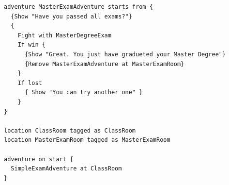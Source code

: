 \documentclass	{xmgr}
\begin{document}
\begin{lstlisting}
adventure MasterExamAdventure starts from {
  {Show "Have you passed all exams?"}
  {
    Fight with MasterDegreeExam
    If win {
      {Show "Great. You just have gradueted your Master Degree"}
      {Remove MasterExamAdventure at MasterExamRoom}
    }
    If lost 
      { Show "You can try another one" }
    }
}

location ClassRoom tagged as ClassRoom
location MasterExamRoom tagged as MasterExamRoom

adventure on start {
  SimpleExamAdventure at ClassRoom
}

\end{lstlisting}




\listoftables

\listoffigures

\oswiadczenie
\end{document}
